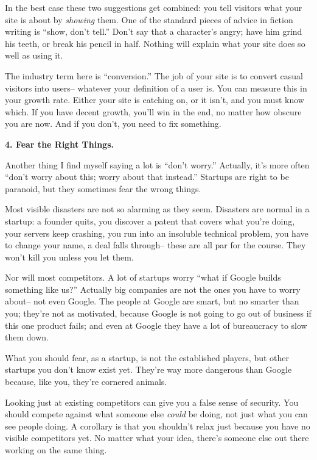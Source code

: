 \documentclass[12pt]{book}
\begin{document}
In the best case these two suggestions get combined: you tell visitors
what your site is about by \emph{showing} them. One of the standard
pieces of advice in fiction writing is ``show, don't tell.'' Don't say
that a character's angry; have him grind his teeth, or break his pencil
in half. Nothing will explain what your site does so well as using it.

The industry term here is ``conversion.'' The job of your site is to
convert casual visitors into users-- whatever your definition of a user
is. You can measure this in your growth rate. Either your site is
catching on, or it isn't, and you must know which. If you have decent
growth, you'll win in the end, no matter how obscure you are now. And if
you don't, you need to fix something.

\textbf{4. Fear the Right Things.}

Another thing I find myself saying a lot is ``don't worry.'' Actually,
it's more often ``don't worry about this; worry about that instead.''
Startups are right to be paranoid, but they sometimes fear the wrong
things.

Most visible disasters are not so alarming as they seem. Disasters are
normal in a startup: a founder quits, you discover a patent that covers
what you're doing, your servers keep crashing, you run into an insoluble
technical problem, you have to change your name, a deal falls through--
these are all par for the course. They won't kill you unless you let
them.

Nor will most competitors. A lot of startups worry ``what if Google
builds something like us?'' Actually big companies are not the ones you
have to worry about-- not even Google. The people at Google are smart,
but no smarter than you; they're not as motivated, because Google is not
going to go out of business if this one product fails; and even at
Google they have a lot of bureaucracy to slow them down.

What you should fear, as a startup, is not the established players, but
other startups you don't know exist yet. They're way more dangerous than
Google because, like you, they're cornered animals.

Looking just at existing competitors can give you a false sense of
security. You should compete against what someone else \emph{could} be
doing, not just what you can see people doing. A corollary is that you
shouldn't relax just because you have no visible competitors yet. No
matter what your idea, there's someone else out there working on the
same thing.
\end{document}
